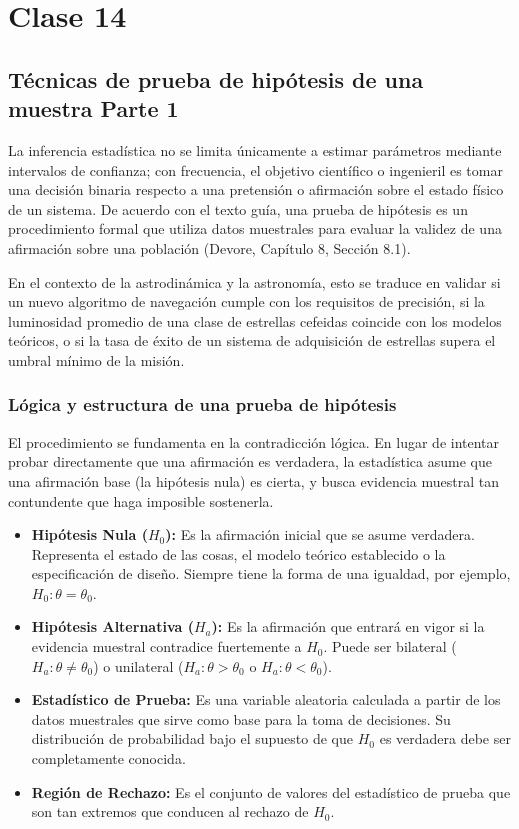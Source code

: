 \chapter{Clase 14}

\section{Técnicas de prueba de hipótesis de una muestra Parte 1}

La inferencia estadística no se limita únicamente a estimar parámetros mediante intervalos de confianza; con frecuencia, el objetivo científico o ingenieril es tomar una decisión binaria respecto a una pretensión o afirmación sobre el estado físico de un sistema. De acuerdo con el texto guía, una prueba de hipótesis es un procedimiento formal que utiliza datos muestrales para evaluar la validez de una afirmación sobre una población (Devore, Capítulo 8, Sección 8.1). 

En el contexto de la astrodinámica y la astronomía, esto se traduce en validar si un nuevo algoritmo de navegación cumple con los requisitos de precisión, si la luminosidad promedio de una clase de estrellas cefeidas coincide con los modelos teóricos, o si la tasa de éxito de un sistema de adquisición de estrellas supera el umbral mínimo de la misión.

\subsection{Lógica y estructura de una prueba de hipótesis}

El procedimiento se fundamenta en la contradicción lógica. En lugar de intentar probar directamente que una afirmación es verdadera, la estadística asume que una afirmación base (la hipótesis nula) es cierta, y busca evidencia muestral tan contundente que haga imposible sostenerla.

\begin{itemize}
    \item \textbf{Hipótesis Nula ($H_0$):} Es la afirmación inicial que se asume verdadera. Representa el estado de las cosas, el modelo teórico establecido o la especificación de diseño. Siempre tiene la forma de una igualdad, por ejemplo, $H_0: \theta = \theta_0$.
    \item \textbf{Hipótesis Alternativa ($H_a$):} Es la afirmación que entrará en vigor si la evidencia muestral contradice fuertemente a $H_0$. Puede ser bilateral ($H_a: \theta \neq \theta_0$) o unilateral ($H_a: \theta > \theta_0$ o $H_a: \theta < \theta_0$).
    \item \textbf{Estadístico de Prueba:} Es una variable aleatoria calculada a partir de los datos muestrales que sirve como base para la toma de decisiones. Su distribución de probabilidad bajo el supuesto de que $H_0$ es verdadera debe ser completamente conocida.
    \item \textbf{Región de Rechazo:} Es el conjunto de valores del estadístico de prueba que son tan extremos que conducen al rechazo de $H_0$.
\end{itemize}

